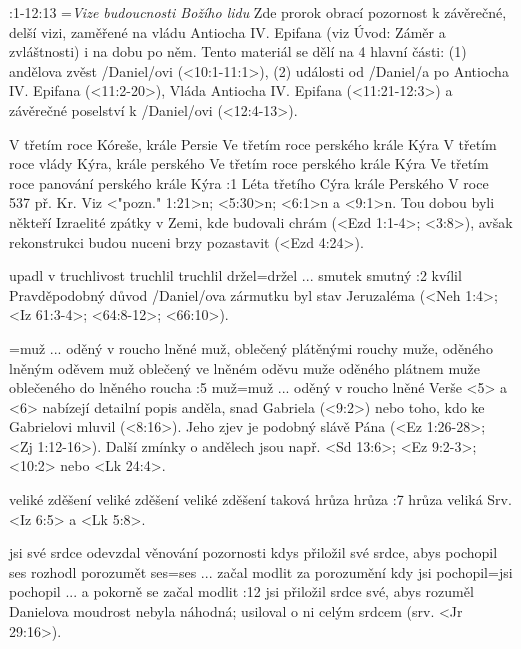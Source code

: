               

:1-12:13 {}={\it Vize budoucnosti Božího lidu} Zde prorok obrací pozornost k  závěrečné, delší vizi, zaměřené na vládu Antiocha IV. Epifana (viz Úvod: Záměr a zvláštnosti) i na dobu po něm. Tento materiál se dělí na 4 hlavní části: (1) andělova zvěst \x/Daniel/ovi (<10:1-11:1>), (2) události od \x/Daniel/a po Antiocha IV. Epifana  (<11:2-20>), Vláda Antiocha IV. Epifana (<11:21-12:3>) a závěrečné poselství k \x/Daniel/ovi (<12:4-13>). 


    {V třetím roce Kóreše, krále Persie}   %
    {Ve třetím roce perského krále Kýra}   %
    {V třetím roce vlády Kýra, krále perského}   %
    {Ve třetím roce perského krále Kýra}   %
    {Ve třetím roce panování perského krále Kýra}   %
:1 {Léta třetího Cýra krále Perského} V roce 537 př. Kr. Viz <"pozn." 1:21>n; <5:30>n; <6:1>n a <9:1>n. Tou dobou byli někteří Izraelité  zpátky v Zemi, kde budovali chrám (<Ezd 1:1-4>; <3:8>), avšak rekonstrukci budou nuceni brzy pozastavit (<Ezd 4:24>).

 {upadl v truchlivost} {truchlil} {truchlil} {držel}={držel ... smutek} {smutný}
:2 {kvílil} Pravděpodobný důvod \x/Daniel/ova zármutku byl stav Jeruzaléma (<Neh 1:4>; <Iz 61:3-4>; <64:8-12>; <66:10>).

={muž ... oděný v roucho lněné} 
           {muž, oblečený plátěnými rouchy} 
           {muže, oděného lněným oděvem} 
           {muž oblečený ve lněném oděvu} 
           {muže oděného plátnem} 
           {muže oblečeného do lněného roucha}
:5 {muž}={muž ... oděný v roucho lněné} 
    Verše <5> a <6> nabízejí detailní popis anděla, snad Gabriela (<9:2>) nebo toho, kdo ke Gabrielovi mluvil (<8:16>). Jeho zjev je podobný slávě Pána (<Ez 1:26-28>; <Zj 1:12-16>). Další zmínky o andělech jsou např.  <Sd 13:6>; <Ez 9:2-3>; <10:2> nebo <Lk 24:4>.
    
    {veliké zděšení} %
    {veliké zděšení} %
    {veliké zděšení} %
    {taková hrůza}   %
    {hrůza}          %
:7 {hrůza veliká} Srv. <Iz 6:5> a <Lk 5:8>.

    {jsi své srdce odevzdal věnování pozornosti}   %
    {kdys přiložil své srdce, abys pochopil}   %
    {ses rozhodl porozumět}   %
    {ses}={ses ... začal modlit za porozumění}   %
    {kdy jsi pochopil}={jsi pochopil ... a pokorně se začal modlit}   %
:12 {jsi přiložil srdce své, abys rozuměl} Danielova moudrost nebyla náhodná; usiloval o ni celým srdcem (srv. <Jr 29:16>). 

